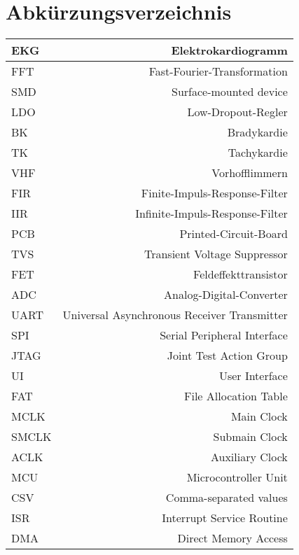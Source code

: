 
\section{Abkürzungsverzeichnis} 

\begin{tabular}[]{l|r}
EKG & Elektrokardiogramm 
\\
\hline
FFT & Fast-Fourier-Transformation 
\\
\hline
SMD & Surface-mounted device 
\\
\hline
LDO & Low-Dropout-Regler 
\\
\hline
BK & Bradykardie 
\\
\hline
TK & Tachykardie
\\
\hline
VHF & Vorhofflimmern
\\
\hline
FIR & Finite-Impuls-Response-Filter
\\
\hline
IIR & Infinite-Impuls-Response-Filter
\\
\hline
PCB & Printed-Circuit-Board
\\
\hline
TVS & Transient Voltage Suppressor
\\
\hline
FET & Feldeffekttransistor
\\
\hline
ADC & Analog-Digital-Converter
\\
\hline
UART & Universal Asynchronous Receiver Transmitter
\\
\hline
SPI & Serial Peripheral Interface
\\
\hline
JTAG & Joint Test Action Group
\\
\hline
UI & User Interface
\\
\hline
FAT & File Allocation Table
\\
\hline
MCLK & Main Clock
\\
\hline
SMCLK & Submain Clock
\\
\hline
ACLK & Auxiliary Clock
\\
\hline
MCU & Microcontroller Unit
\\
\hline
CSV & Comma-separated values
\\
\hline
ISR & Interrupt Service Routine
\\
\hline
DMA & Direct Memory Access

\end{tabular}
